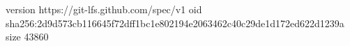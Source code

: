 version https://git-lfs.github.com/spec/v1
oid sha256:2d9d573cb116645f72dff1bc1e802194e2063462c40c29de1d172ed622d1239a
size 43860
